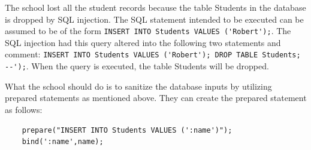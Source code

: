 \begin{enumerate}
The school lost all the student records because the table Students in the database is dropped by SQL injection. The SQL statement intended to be executed can be assumed to be of the form \lstinline{INSERT INTO Students VALUES ('Robert');}. The SQL injection had this query altered into the following two statements and comment: \lstinline{INSERT INTO Students VALUES ('Robert'); DROP TABLE Students; --');}. When the query is executed, the table Students will be dropped.

  What the school should do is to sanitize the database inputs by utilizing prepared statements as mentioned above. They can create the prepared statement as follows:
  \begin{lstlisting}
    prepare("INSERT INTO Students VALUES (':name')");
    bind(':name',name);
  \end{lstlisting}

\end{enumerate}
